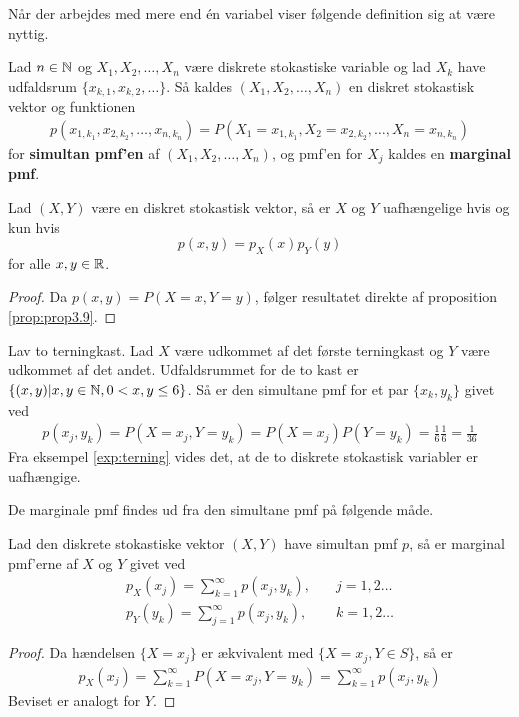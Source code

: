 Når der arbejdes med mere end én variabel viser følgende definition sig at være nyttig.
\begin{defn} %
    Lad $n \in \mathbb{N}$ og $X_1, X_2, \ldots, X_n$ være diskrete stokastiske variable og lad $X_k$ have udfaldsrum $\{x_{k, 1}, x_{k, 2}, \ldots\}$. Så kaldes $(X_1, X_2, \ldots, X_n)$ en diskret stokastisk vektor og funktionen
    \begin{align*}
        p(x_{1, k_1}, x_{2, k_2}, \ldots, x_{n, k_n}) = P(X_1 = x_{1,k_1}, X_2 = x_{2, k_2}, \ldots, X_n = x_{n, k_n})
    \end{align*}
    for \textbf{simultan pmf'en} af $(X_1, X_2, \ldots, X_n)$, og pmf'en for $X_j$ kaldes en \textbf{marginal pmf}.
\end{defn}
\begin{cor}
Lad $(X, Y)$ være en diskret stokastisk vektor, så er $X$ og $Y$ uafhængelige hvis og kun hvis
\begin{equation*}
    p(x, y) = p_X(x)p_Y(y)
\end{equation*}
for alle $x, y \in \mathbb{R}$.
\end{cor}
\begin{proof}
Da $p(x, y) = P(X = x, Y = y)$, følger resultatet direkte af proposition \ref{prop:prop3.9}.
\end{proof}


\begin{exmp} \label{examp:tern_vektor}
    Lav to terningkast. Lad $X$ være udkommet af det første terningkast og $Y$ være udkommet af det andet. 
    Udfaldsrummet for de to kast er $\{(x, y) | x, y \in \mathbb{N}, 0 < x, y \leq 6\}$. Så er den simultane pmf for et par $\{x_k,y_k\}$ givet ved
    \begin{align*}
        p(x_j,y_k)=P(X=x_j,Y=y_k)=P(X=x_j)P(Y=y_k)=\frac{1}{6}\frac{1}{6}=\frac{1}{36}
    \end{align*}
Fra eksempel \ref{exp:terning} vides det, at de to diskrete stokastisk variabler er uafhængige.
\end{exmp}

De marginale pmf findes ud fra den simultane pmf på følgende måde. 
\begin{prop}\label{prop:marginalPmf} %
    Lad den diskrete stokastiske vektor $(X,Y)$ have simultan pmf $p$, så er marginal pmf'erne af $X$ og $Y$ givet ved
    \begin{align*}
        p_X(x_j)=\sum_{k=1}^\infty p(x_j,y_k), \quad & j=1,2\ldots
        \\
        p_Y(y_k)=\sum_{j=1}^\infty p(x_j,y_k), \quad & k=1,2\ldots
    \end{align*}
\end{prop}
\begin{proof}
Da hændelsen $\{X=x_j\}$ er ækvivalent med $\{X=x_j,Y \in S\}$, så er 
\begin{align*}
    p_X(x_j)=\sum_{k=1}^\infty P(X=x_j,Y=y_k)=\sum_{k=1}^\infty p(x_j,y_k)
\end{align*}
Beviset er analogt for $Y$. 
\end{proof}

